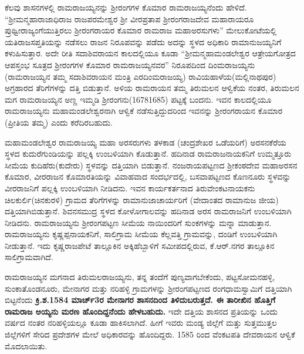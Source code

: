 ಕೆಲವು ಶಾಸನಗಳಲ್ಲಿ ರಾಮರಾಜಯ್ಯನನ್ನು ಶ‍್ರೀರಂಗಗಳ ಕೊಮಾರ ರಾಮರಾಜಯ್ಯನೆಂದು ಹೇಳಿದೆ. “ಶ‍್ರೀಮನ್ಮಹಾ\-ರಾಜಾಧಿರಾಜ ರಾಜಪರಮೇಶ್ವರ ಶ‍್ರೀ ವೀರಪ್ರತಾಪ ಶ‍್ರೀರಂಗರಾಜದೇವ ಮಹಾರಾಯರೂ ಪ್ರುಥ್ವೀರಾಜ್ಯಂಗೆಯುತ್ತಿರಲು ಶ‍್ರೀರಂಗರಾಯರ ಕೊಮಾರ ರಾಮರಾಜ ಮಹಾಅರಸುಗಳು” ಮೇಲುಕೋಟೆಯಲ್ಲಿ ಯತಿರಾಜಸಪ್ತತಿಯನ್ನು ನಡೆಸಲು ರಾಜನ ನಿರೂಪವನ್ನು ಪಡೆದು ಅದನ್ನು ಸ್ಥಳದ ಅಧಿಕಾರಿ ರಾಮಾನುಜಯ್ಯನಿಗೆ ಕಳುಹಿಸುತ್ತಾರ. ಅದೇ ರೀತಿ ಸದಾಶಿವರಾಯನ ಕಾಲದಲ್ಲಿಯೂ ಕೂಡಾ “ಶ‍್ರೀಮನ್ಮಹಾಮಂಡಲೇಶ್ವರ ಆತ್ರೇಯಗೋತ್ರದ ಆಪಸ್ತಂಭ ಸೂತ್ರದ ಶ‍್ರೀರಂಗಗಳ ಕೊಮಾರ ರಾಮರಾಜಯ್ಯನವರ” ನಿರೂಪದಿಂದ ದಿಂಮರಾಜಯ್ಯನು (ರಾಮರಾಜಯ್ಯನ ತಮ್ಮ ಸದಾಶಿವರಾಯನ ಮಂತ್ರಿ ಎರದಿಂಮರಾಜಯ್ಯ) ರಾವಿಯಹಾಳೆಯ(ಮಲ್ಲಿನಾಥಪುರ) ಅಗ್ರಹಾರದ ತೆರಿಗೆಗಳನ್ನು ದತ್ತಿ ಬಿಡುತ್ತಾನೆ. ಅಳಿಯ ರಾಮರಾಯನ ತಮ್ಮ ತಿರುಮಲನ ಆಳ್ವಿಕೆಯ ನಂತರ, ತಿರುಮಲನ ಮಗ ರಾಮರಾಜಯ್ಯನ ಅಣ್ಣ ಇಮ್ಮಡಿ ಶ‍್ರೀರಂಗನು(1678\enginline{-}1685) ಪಟ್ಟಕ್ಕೆ ಬಂದನು. ಇವನ ಕಾಲದಲ್ಲಿಯೂ ರಾಮರಾಜಯ್ಯನು ಮಹಾಮಂಡಲೇಶ್ವರನಾಗಿ ಆಳ್ವಿಕೆ ನಡೆಸುತ್ತಿದ್ದುದರಿಂದ ಇವನನ್ನು ಶ‍್ರೀರಂಗರಾಯನ ಕೊಮಾರ (ಪ್ರೀತಿಯ ತಮ್ಮ) ಎಂದು ಕರೆದಿರಬಹುದು.

ಮಹಾಮಂಡಲೇಶ್ವರ ರಾಮರಾಜಯ್ಯ ಮಹಾ ಅರಸರುಗಳು ತಳಕಾಡ (ಚಂದ್ರಶೇಖರ ಒಡೆಯರಿಗೆ) ಅರಸನಕೆರೆಯ ಸ್ಥಳದ ಕುದುರೆಗುಂಡಿಯನ್ನು ಪಲ್ಲಕ್ಕಿ ಉಂಬಳಿಯಾಗಿ ಕೊಡುತ್ತಾನೆ. ಹದಿನಾಡ ರಾಮರಾಜನಾಯಕನಿಗೆ ಉಮ್ಮತ್ತೂರು ಸೀಮೆಯ ಕುದಿಹೆರು(ಕುದೇರು) ಸ್ಥಳವನ್ನು ದತ್ತಿಯಾಗಿ ಬಿಡುತ್ತಾನೆ. ನಂಜರಾಯಪಟ್ಟಣದ ಶ‍್ರೀಕಂಠದೇವ ಮಹಾಅರಸನ ಕೊಮಾರ, ವೀರರಾಜನ ಕೊಮಾರತಿಯನ್ನು ವಿವಾಹವಾದ ಸಂದರ್ಭದಲ್ಲಿ, ಬಸವಾಪಟ್ಟಣದ ಕೊಣನೂರು ಸ್ಥಳವನ್ನು ವೀರರಾಜನಿಗೆ ಪಲ್ಲಕ್ಕಿ ಉಂಬಳಿಯಾಗಿ ನೀಡಿದನು. ಇವನ ಕಾರ್ಯಕರ್ತನಾದ ತಿರುವೇಂಕಟನಾಯಕನು ಚಿಲಕುರ್ಲಿ\break (ಚಿನಕುರಳಿ) ಗ್ರಾಮದ ತೆರಿಗೆಗಳನ್ನು ರಾಮಾನುಜಾಚಾರ್ಯರಿಗೆ (ವೇದಾಂತದ ರಾಮಾನುಜ ಜೀಯ) ದತ್ತಿಯಾಗಿ\break ಬಿಡುತ್ತಾನೆ. ಶಿವನಸಮುದ್ರ ಸ್ಥಳದ ಕೋಳೋಗಾಲವನ್ನು ಹದಿನಾಡ ಅರಸ ರಾಮರಾಜನಿಗೆ ಉಂಬಳಿಯಾಗಿ ನೀಡಿದನು. ರಾಮರಾಜಯ್ಯನು ಶ‍್ರೀರಂಗಪಟ್ಟಣ ಸೀಮೆಯ ನಾಯಿಂದರಿಗೆ ಸುಂಕಗಳನ್ನು ಮನ್ನಾ ಮಾಡುತ್ತಾನ. ರಾಮರಾಜಯ್ಯನು ಕೃಷ್ಣಪ್ಪನಾಯಕನಿಗೆ, ಸಾಲಿಗ್ರಾಮ ಸೀಮೆಯ ಕೆಲ್ಲವತ್ತಿ ಗ್ರಾಮವನ್ನು, ದಂಡಿಗೆ ಉಂಬಳಿಯಾಗಿ ನೀಡುತ್ತಾನೆ. ಇದು ಕೃಷ್ಣರಾಜಪೇಟೆ ತಾಲ್ಲೂಕಿನ ಅಕ್ಕಿಹೆಬ್ಬಾಳಿಗೆ ಸಮೀಪದಲ್ಲಿರುವ, ಕೆ.ಆರ್​.ನಗರ ತಾಲ್ಲೂಕಿನ ಸಾಲಿಗ್ರಾಮವಾಗಿದೆ.

ರಾಮರಾಜಯ್ಯನ ಮಗನಾದ ತಿರುಮಲರಾಜಯ್ಯನು, ತನ್ನ ತಂದೆಗೆ ಪುಣ್ಯವಾಗಬೇಕೆಂದು, ಪಟ್ಟಸೋಮನಹಳ್ಳಿ, ಸುಂಕಾತೊಂಡನೂರು, ಮೇನಾಗರ ಮತ್ತು ನರಿಹಳ್ಳಿ ಗ್ರಾಮಗಳನ್ನು ಶ‍್ರೀರಂಗಪಟ್ಟಣದ ರಂಗಧಾಮಸ್ವಾಮಿಗೆ ದತ್ತಿಯಾಗಿ ಬಿಟ್ಟನೆಂದು \textbf{ಕ್ರಿ.ಶ.1584 ಮಾರ್ಚ್3ರ ಮೇನಾಗರ ಶಾಸನದಿಂದ ತಿಳಿದುಬರುತ್ತದೆ. ಈ ತಾರೀಖಿನ ಹೊತ್ತಿಗೆ ರಾಮರಾಜ ಅಯ್ಯನು ಮರಣ ಹೊಂದಿದ್ದನೆಂದು ಹೇಳಬಹುದು.} ಇದೇ ದತ್ತಿಯ ಶಾಸನದ ಪ್ರತಿಯನ್ನು ಒಂದು ವರ್ಷದ ನಂತರ ನರಿಹಳ್ಳಿಯಲ್ಲೂ ಕೂಡಾ ಹಾಕಿಸಲಾಗಿದೆ. ಹೀಗೆ ಇವರು ಮಂಡ್ಯ ಜಿಲ್ಲೆಗೆ ಮತ್ತು ಸುತ್ತಮುತ್ತಲ ಜಿಲ್ಲೆಗಳಿಗೆ ಸೇರಿದ ಪ್ರದೇಶಗಳ ಮೇಲೆ ಅಧಿಕಾರವನ್ನು ಹೊಂದಿದ್ದರು. 1585 ರಿಂದ ವೆಂಕಟಪತಿ ದೇವರಾಯನ ಆಳ್ವಿಕೆ ಮೊದಲಾಯಿತು.

